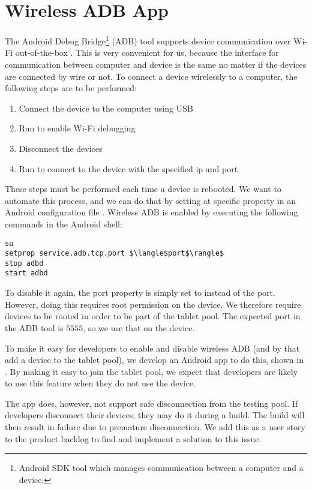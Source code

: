 \section{Wireless ADB App}\label{sec:wireless_adb}
The Android Debug Bridge\footnote{Android SDK tool which manages communication between a computer and a device.} (ADB) tool supports device communication over Wi-Fi out-of-the-box \parencite{AndroidADB}. This is very convenient for us, because the interface for communication between computer and device is the same no matter if the devices are connected by wire or not. To connect a device wirelessly to a computer, the following steps are to be performed:
\begin{enumerate}
  \item Connect the device to the computer using USB
  \item Run  to enable Wi-Fi debugging
  \item Disconnect the devices
  \item Run  to connect to the device with the specified ip and port
\end{enumerate}
These steps must be performed each time a device is rebooted. We want to automate this process, and we can do that by setting at specific property in an Android configuration file \parencite{stackoverflow-adb-tcp}. Wireless ADB is enabled by executing the following commands in the Android shell:
\begin{lstlisting}[mathescape]
su
setprop service.adb.tcp.port $\langle$port$\rangle$
stop adbd
start adbd
\end{lstlisting}
To disable it again, the port property is simply set to  instead of the port. However, doing this requires root permission on the device. We therefore require devices to be rooted in order to be part of the tablet pool. The expected port in the ADB tool is $5555$, so we use that on the device.

To make it easy for developers to enable and disable wireless ADB (and by that add a device to the tablet pool), we develop an Android app to do this, shown in . By making it easy to join the tablet pool, we expect that developers are likely to use this feature when they do not use the device.

The app does, however, not support safe disconnection from the testing pool. If developers disconnect their devices, they may do it during a build. The build will then result in failure due to premature disconnection. We add this as a user story to the product backlog to find and implement a solution to this issue.

